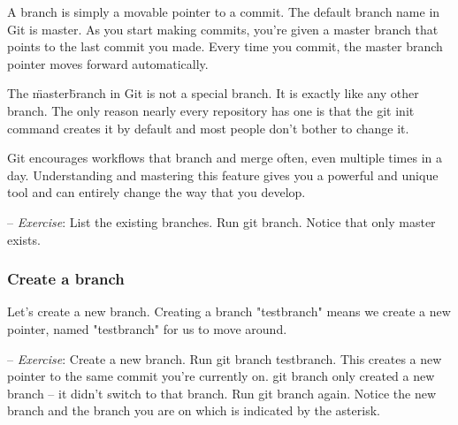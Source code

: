 \documentclass[12pt,a4]{article}
\newcommand{\ilcode}[1]{\textcolor[RGB]{160, 110, 220}{#1}}
\begin{document}
\begin{center}
\end{center}

A branch is simply a movable pointer to a commit. The default branch name in Git
is master. As you start making commits, you’re given a master branch that points
to the last commit you made. Every time you commit, the master branch pointer
moves forward automatically.

The \"master\" branch in Git is not a special branch. It is exactly like any
other branch. The only reason nearly every repository has one is that the
\ilcode{git init} command creates it by default and most people don’t bother to
change it.

Git encourages workflows that branch and merge often, even multiple times in a
day. Understanding and mastering this feature gives you a powerful and unique
tool and can entirely change the way that you develop.

{\sf -- \emph{Exercise}:} List the existing branches. Run \ilcode{git branch}.
Notice that only master exists.

\subsubsection{Create a branch}

\begin{center}
\end{center}

Let's create a new branch. Creating a branch "testbranch" means we create a
new pointer, named "testbranch" for us to move around.

{\sf -- \emph{Exercise}:} Create a new branch. Run \ilcode{git branch
testbranch}. This creates a new pointer to the same commit you’re currently on.
\ilcode{git branch} only created a new branch -- it didn’t switch to that
branch. Run \ilcode{git branch} again. Notice the new branch and the branch you
are on which is indicated by the asterisk.
\end{document}
